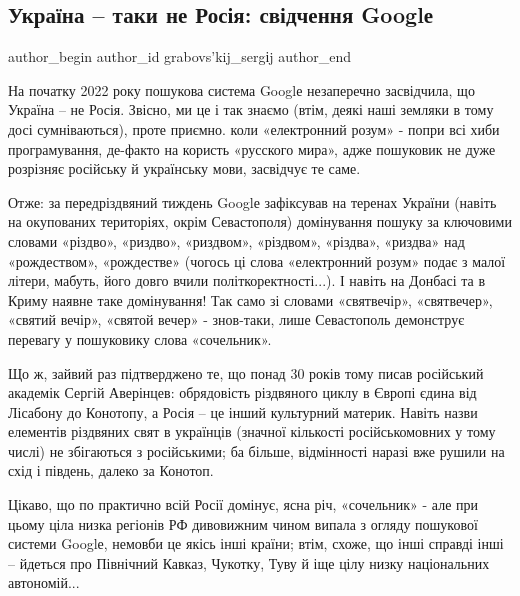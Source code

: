  
 
 
 
 
\subsection{Україна – таки не Росія: свідчення Googlе}
\label{sec:12_01_2022.stz.news.ua.den.1.ukraina_ne_rossia_google}

\ifcmt
 author_begin
   author_id grabovs'kij_sergіj
 author_end
\fi

На початку 2022 року пошукова система Googlе незаперечно засвідчила, що Україна
– не Росія. Звісно, ми це і так знаємо (втім, деякі наші земляки в тому досі
сумніваються), проте приємно. коли «електронний розум» - попри всі хиби
програмування, де-факто на користь «русского мира», адже пошуковик не дуже
розрізняє російську й українську мови, засвідчує те саме.

Отже: за передріздвяний тиждень Googlе зафіксував на теренах України (навіть на
окупованих територіях, окрім Севастополя) домінування пошуку за ключовими
словами «різдво», «риздво», «риздвом», «різдвом», «різдва», «риздва» над
«рождеством», «рождестве» (чогось ці слова «електронний розум» подає з малої
літери, мабуть, його довго вчили політкоректності...). І навіть на Донбасі та в
Криму наявне таке домінування! Так само зі словами «святвечір», «святвечер»,
«святий вечір», «святой вечер» - знов-таки, лише Севастополь демонструє
перевагу у пошуковику слова «сочельник».

Що ж, зайвий раз підтверджено те, що понад 30 років тому писав російський
академік Сергій Аверінцев: обрядовість різдвяного циклу в Європі єдина від
Лісабону до Конотопу, а Росія – це інший культурний материк. Навіть назви
елементів різдвяних свят в українців (значної кількості російськомовних у тому
числі) не збігаються з російськими; ба більше, відмінності наразі вже рушили на
схід і південь, далеко за Конотоп.

Цікаво, що по практично всій Росії домінує, ясна річ, «сочельник» - але при
цьому ціла низка регіонів РФ дивовижним чином випала з огляду пошукової системи
Googlе, немовби це якісь інші країни; втім, схоже, що інші справді інші –
йдеться про Північний Кавказ, Чукотку, Туву й іще цілу низку національних
автономій...

